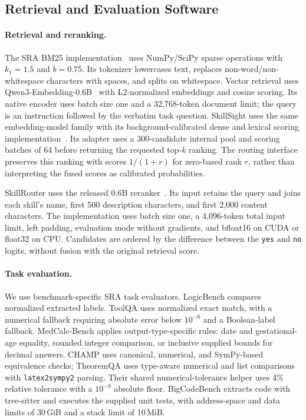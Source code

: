 \subsection{Retrieval and Evaluation Software}
\label{app:implementation-software}
\paragraph{Retrieval and reranking.}
The SRA BM25 implementation~\citep{robertson2009bm25} uses NumPy/SciPy sparse operations with $k_1=1.5$ and $b=0.75$. Its tokenizer lowercases text, replaces non-word/non-whitespace characters with spaces, and splits on whitespace. Vector retrieval uses Qwen3-Embedding-0.6B~\citep{zhang2025qwen3embedding} with L2-normalized embeddings and cosine scoring. Its native encoder uses batch size one and a 32,768-token document limit; the query is an instruction followed by the verbatim task question. SkillSight uses the same embedding-model family with its background-calibrated dense and lexical scoring implementation~\citep{xiao2026skillsightcalibratinggenericcontent}. Its adapter uses a 300-candidate internal pool and scoring batches of 64 before returning the requested top-$k$ ranking. The routing interface preserves this ranking with scores $1/(1+r)$ for zero-based rank $r$, rather than interpreting the fused scores as calibrated probabilities.

SkillRouter uses the released 0.6B reranker~\citep{zheng2026skillrouter}. Its input retains the query and joins each skill's name, first 500 description characters, and first 2,000 content characters. The implementation uses batch size one, a 4,096-token total input limit, left padding, evaluation mode without gradients, and bfloat16 on CUDA or float32 on CPU. Candidates are ordered by the difference between the \texttt{yes} and \texttt{no} logits, without fusion with the original retrieval score.

\paragraph{Task evaluation.}
We use benchmark-specific SRA task evaluators. LogicBench compares normalized extracted labels. ToolQA uses normalized exact match, with a numerical fallback requiring absolute error below $10^{-6}$ and a Boolean-label fallback. MedCalc-Bench applies output-type-specific rules: date and gestational-age equality, rounded integer comparison, or inclusive supplied bounds for decimal answers. CHAMP uses canonical, numerical, and SymPy-based equivalence checks; TheoremQA uses type-aware numerical and list comparisons with \texttt{latex2sympy2} parsing. Their shared numerical-tolerance helper uses 4\% relative tolerance with a $10^{-9}$ absolute floor. BigCodeBench extracts code with tree-sitter and executes the supplied unit tests, with address-space and data limits of 30\,GiB and a stack limit of 10\,MiB.


